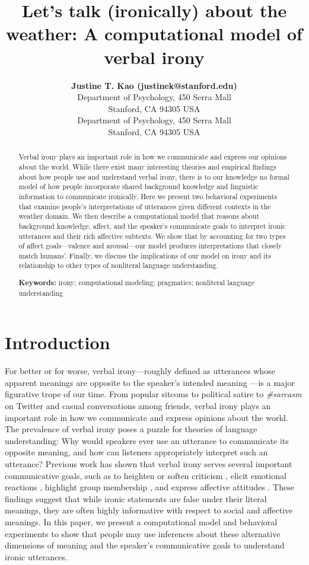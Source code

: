 \documentclass[10pt,letterpaper]{article}
\title{Let's talk (ironically) about the weather: A computational model of verbal irony}
\author{{\large \bf Justine T. Kao
(justinek@stanford.edu)} \\
  Department of Psychology, 450 Serra Mall \\
  Stanford, CA 94305 USA
  \AND {\large \bf Noah D. Goodman (ngoodman@stanford.edu)} \\
  Department of Psychology, 450 Serra Mall \\
  Stanford, CA 94305 USA}
\begin{document}
\maketitle


\begin{abstract}
Verbal irony plays an important role in how we communicate and express our opinions about the world. While there exist many interesting theories and empirical findings about how people use and understand verbal irony, there is to our knowledge no formal model of how people incorporate shared background knowledge and linguistic information to communicate ironically. Here we present two behavioral experiments that examine people's interpretations of utterances given different contexts in the weather domain. We then describe a computational model that reasons about background knowledge, affect, and the speaker's communicate goals to interpret ironic utterances and their rich affective subtexts. We show that by accounting for two types of affect goals---valence and arousal---our model produces interpretations that closely match humans'. Finally, we discuss the implications of our model on irony and its relationship to other types of nonliteral language understanding.


\textbf{Keywords:} 
irony; computational modeling; pragmatics; nonliteral language understanding
\end{abstract}


\section{Introduction}
For better or for worse, verbal irony---roughly defined as utterances whose apparent meanings are opposite to the speaker's intended meaning \cite{roberts1994people, colston2000contrast}---is a major figurative trope of our time. From popular sitcoms to political satire to \emph{\#sarcasm} on Twitter and casual conversations among friends, verbal irony plays an important role in how we communicate and express  opinions about the world. The prevalence of verbal irony poses a puzzle for theories of language understanding: Why would speakers ever use an utterance to communicate its opposite meaning, and how can listeners appropriately interpret such an utterance? Previous work has shown that verbal irony serves several important communicative goals, such as to heighten or soften criticism \cite{colston1997salting}, elicit emotional reactions \cite{leggitt2000emotional}, highlight group membership \cite{gibbs2000irony}, and express affective attitudes \cite{colston1998you, colston1997ve}. These findings suggest that while ironic statements are false under their literal meanings, they are often highly informative with respect to social and affective meanings. 
In this paper, we present a computational model and behavioral experiments to show that people may use inferences about these alternative dimensions of meaning and the speaker's communicative goals to understand ironic utterances.  
\end{document}
